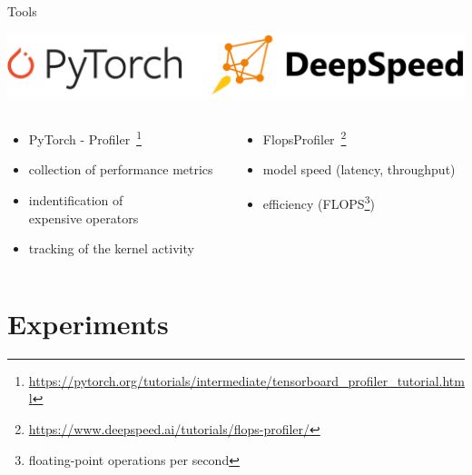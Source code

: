 \documentclass[compress,aspectratio=169]{beamer}
\begin{document}
\begin{frame}[t]{Tools}
    \begin{center}
        \includegraphics[width=1\textwidth]{../../data/tools}
    \end{center}
    \begin{columns}[t]
    \begin{column}{0.5\textwidth}
                \begin{itemize}
                    \item PyTorch - Profiler~\footnote{\tiny{\url{https://pytorch.org/tutorials/intermediate/tensorboard_profiler_tutorial.html}}}
                    \item collection of performance metrics
                    \item indentification of\\expensive operators
                    \item tracking of the kernel activity
                \end{itemize}
    \end{column}
    \begin{column}{0.5\textwidth}
                \begin{itemize}
                    \item FlopsProfiler~\footnote{\tiny{\url{https://www.deepspeed.ai/tutorials/flops-profiler/}}}
                    \item model speed (latency, throughput)
                    \item efficiency (FLOPS\footnote{\tiny{floating-point operations per second}})
                \end{itemize}
    \end{column}
    \end{columns}
\end{frame}

\section{Experiments}
\sectionIntro %
\end{document}
